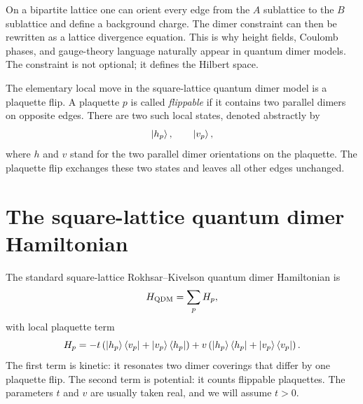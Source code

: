 \begin{remark}
On a bipartite lattice one can orient every edge from the \(A\) sublattice to
the \(B\) sublattice and define a background charge.  The dimer constraint can
then be rewritten as a lattice divergence equation.  This is why height fields,
Coulomb phases, and gauge-theory language naturally appear in quantum dimer
models.  The constraint is not optional; it defines the Hilbert space.
\end{remark}

The elementary local move in the square-lattice quantum dimer model is a
plaquette flip.  A plaquette \(p\) is called \emph{flippable} if it contains two
parallel dimers on opposite edges.  There are two such local states, denoted
abstractly by
\begin{equation}
\label{eq:local-dimer-plaquette-states}
    \left|h_p\right\rangle,
    \qquad
    \left|v_p\right\rangle,
\end{equation}
where \(h\) and \(v\) stand for the two parallel dimer orientations on the
plaquette.  The plaquette flip exchanges these two states and leaves all other
edges unchanged.

\section{The square-lattice quantum dimer Hamiltonian}
\label{sec:square-lattice-qdm-hamiltonian}

The standard square-lattice Rokhsar--Kivelson quantum dimer Hamiltonian is
\begin{equation}
\label{eq:qdm-hamiltonian-square}
    H_{\rm QDM}
    =
    \sum_p H_p,
\end{equation}
with local plaquette term
\begin{equation}
\label{eq:qdm-local-hamiltonian}
    H_p
    =
    -t
    \left(
        \left|h_p\right\rangle\left\langle v_p\right|
        +
        \left|v_p\right\rangle\left\langle h_p\right|
    \right)
    +
    v
    \left(
        \left|h_p\right\rangle\left\langle h_p\right|
        +
        \left|v_p\right\rangle\left\langle v_p\right|
    \right).
\end{equation}
The first term is kinetic: it resonates two dimer coverings that differ by one
plaquette flip.  The second term is potential: it counts flippable plaquettes.
The parameters \(t\) and \(v\) are usually taken real, and we will assume
\(t>0\).

